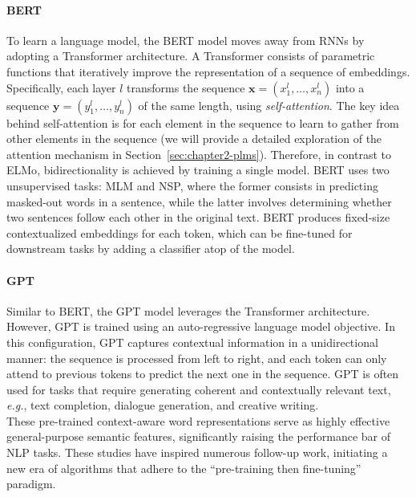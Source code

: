 \paragraph{BERT} To learn a language model, the \ac{BERT} model \citep{devlin2018bert} moves away from \acp{RNN} by adopting a Transformer \citep{vaswani2017attention} architecture. A Transformer consists of parametric functions that iteratively improve the representation of a sequence of embeddings. Specifically, each layer $l$ transforms the sequence $\bm{x} = (x^l_1, \ldots, x^l_n)$ into a sequence $\bm{y} = (y^l_1, \ldots, y^l_n)$ of the same length, using \textit{self-attention}. The key idea behind self-attention is for each element in the sequence to learn to
gather from other elements in the sequence (we will provide a detailed exploration of the attention mechanism in Section~\ref{sec:chapter2-plms}). Therefore, in contrast to \ac{ELMo}, bidirectionality is achieved by training a single model. \ac{BERT} uses two unsupervised tasks: \ac{MLM} and \ac{NSP}, where the former consists in predicting masked-out words in a sentence, while the latter involves determining whether two sentences follow each other in the original text. \ac{BERT} produces fixed-size contextualized embeddings for each token, which can be fine-tuned for downstream tasks by adding a classifier atop of the model.

\paragraph{GPT} Similar to \ac{BERT}, the \ac{GPT} model \citep{radford2018improving} leverages the Transformer architecture. However, \ac{GPT} is trained using an auto-regressive language model objective. In this configuration, \ac{GPT} captures contextual information in a unidirectional manner: the sequence is processed from left to right, and each token can only attend to previous tokens to predict the next one in the sequence. \ac{GPT} is often used for tasks that require generating coherent and contextually relevant text, \textit{e.g.}, text completion, dialogue generation, and creative writing. \\

These pre-trained context-aware word representations serve as highly effective general-purpose semantic features, significantly raising the performance bar of \ac{NLP} tasks. These studies have inspired numerous follow-up work, initiating a new era of algorithms that adhere to the “pre-training then fine-tuning” paradigm. 

